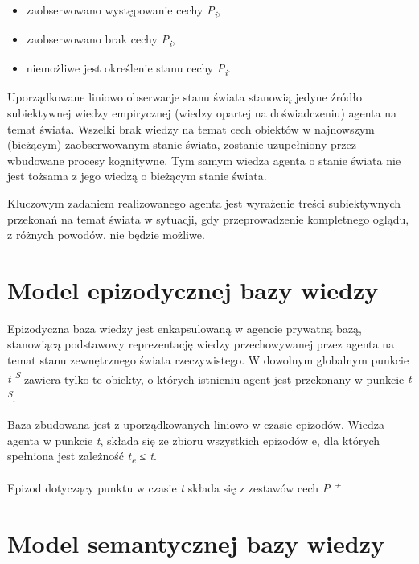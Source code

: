 		\begin{itemize}
		 	\setlength{\itemindent}{.5in}
			\item zaobserwowano występowanie cechy \textit{P\textsubscript{i}},
			\item zaobserwowano brak cechy \textit{P\textsubscript{i}},
			\item niemożliwe jest określenie stanu cechy \textit{P\textsubscript{i}}.
		\end{itemize}
	
	Uporządkowane liniowo obserwacje stanu świata stanowią jedyne źródło subiektywnej wiedzy empirycznej (wiedzy opartej na doświadczeniu) agenta na temat świata. Wszelki brak wiedzy na temat cech obiektów w najnowszym (bieżącym) zaobserwowanym stanie świata, zostanie uzupełniony przez wbudowane procesy kognitywne. Tym samym wiedza agenta o stanie świata nie jest tożsama z jego wiedzą o bieżącym stanie świata.
	
	Kluczowym zadaniem realizowanego agenta jest wyrażenie treści subiektywnych przekonań na temat świata w sytuacji, gdy przeprowadzenie kompletnego oglądu, z różnych powodów, nie będzie możliwe.
	

\section{Model epizodycznej bazy wiedzy}

Epizodyczna baza wiedzy jest enkapsulowaną w agencie prywatną bazą, stanowiącą podstawowy reprezentację wiedzy przechowywanej przez agenta na temat stanu zewnętrznego świata rzeczywistego. W dowolnym globalnym punkcie 
\textit{t\textsuperscript{ S}} 
zawiera tylko te obiekty, o których istnieniu agent jest przekonany w punkcie 
\textit{t\textsuperscript{ S}}.

Baza zbudowana jest z uporządkowanych liniowo w czasie epizodów. Wiedza agenta w punkcie \textit{t}, składa się ze zbioru wszystkich epizodów e, dla których spełniona jest zależność \textit{t\textsubscript{e} ≤ t}.

Epizod dotyczący punktu w czasie \textit{t} składa się z zestawów cech \textit{P\textsuperscript{ +}}


\section{Model semantycznej bazy wiedzy}



